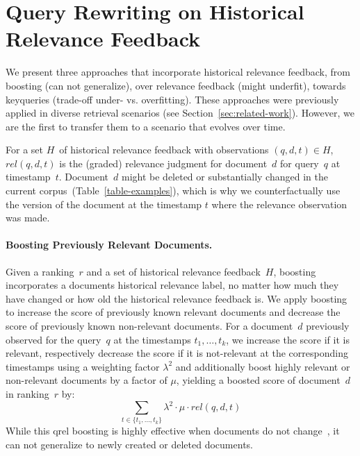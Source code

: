 \section{Query Rewriting on Historical Relevance Feedback}

We present three approaches that incorporate historical relevance feedback, from \Ni boosting (can not generalize), over \Nii relevance feedback (might underfit), towards \Niii keyqueries (trade-off under- vs. overfitting). These approaches were previously applied in diverse retrieval scenarios (see Section~\ref{sec:related-work}). However, we are the first to transfer them to a scenario that evolves over time.

For a set $H$~of historical relevance feedback with observations $(q, d, t) \in H$, $rel(q, d, t)$ is the (graded) relevance judgment for document~$d$ for query~$q$ at timestamp~$t$. Document~$d$ might be deleted or substantially changed in the current corpus~(Table~\ref{table-examples}), which is why we counterfactually use the version of the document at the timestamp $t$ where the relevance observation was made.

\paragraph{Boosting Previously Relevant Documents.} Given a ranking~$r$ and a set of historical relevance feedback~$H$, boosting incorporates a documents historical relevance label, no matter how much they have changed or how old the historical relevance feedback is. We apply boosting to increase the score of previously known relevant documents and decrease the score of previously known non-relevant documents. For a document~$d$ previously observed for the query~$q$ at the timestamps $t_{1}, \ldots, t_{k}$, we increase the score if it is relevant, respectively decrease the score if it is not-relevant at the corresponding timestamps using a weighting factor $\lambda^2$ and additionally boost highly relevant or non-relevant documents by a factor of $\mu$, yielding a boosted score of document~$d$ in ranking~$r$ by:
\begin{equation}
\sum\limits_{t \in \{t_{1}, \ldots, t_{k}\}} \lambda^2 \cdot \mu \cdot rel(q,d,t)
\end{equation}
While this qrel boosting is highly effective when documents do not change~\cite{alkhalifa:2024,keller:2024b}, it can not generalize to newly created or deleted documents.

\enlargethispage*{\baselineskip}
